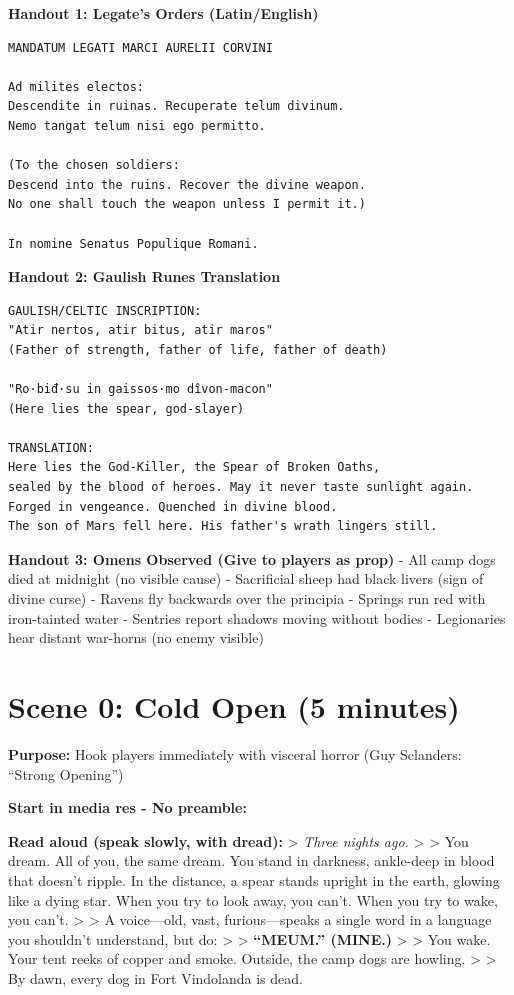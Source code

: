 \documentclass[
]{book}
\begin{document}
\textbf{Handout 1: Legate's Orders (Latin/English)}

\begin{verbatim}
MANDATUM LEGATI MARCI AURELII CORVINI

Ad milites electos:
Descendite in ruinas. Recuperate telum divinum.
Nemo tangat telum nisi ego permitto.

(To the chosen soldiers:
Descend into the ruins. Recover the divine weapon.
No one shall touch the weapon unless I permit it.)

In nomine Senatus Populique Romani.
\end{verbatim}

\textbf{Handout 2: Gaulish Runes Translation}

\begin{verbatim}
GAULISH/CELTIC INSCRIPTION:
"Atir nertos, atir bitus, atir maros"
(Father of strength, father of life, father of death)

"Ro·biđ·su in gaissos·mo dîvon-macon"
(Here lies the spear, god-slayer)

TRANSLATION:
Here lies the God-Killer, the Spear of Broken Oaths,
sealed by the blood of heroes. May it never taste sunlight again.
Forged in vengeance. Quenched in divine blood.
The son of Mars fell here. His father's wrath lingers still.
\end{verbatim}

\textbf{Handout 3: Omens Observed (Give to players as prop)} - All camp
dogs died at midnight (no visible cause) - Sacrificial sheep had black
livers (sign of divine curse) - Ravens fly backwards over the principia
- Springs run red with iron-tainted water - Sentries report shadows
moving without bodies - Legionaries hear distant war-horns (no enemy
visible)

\section{Scene 0: Cold Open (5
minutes)}\label{scene-0-cold-open-5-minutes}

\textbf{Purpose:} Hook players immediately with visceral horror (Guy
Sclanders: ``Strong Opening'')

\textbf{Start in media res - No preamble:}

\textbf{Read aloud (speak slowly, with dread):} \textgreater{}
\emph{Three nights ago.} \textgreater{} \textgreater{} You dream. All of
you, the same dream. You stand in darkness, ankle-deep in blood that
doesn't ripple. In the distance, a spear stands upright in the earth,
glowing like a dying star. When you try to look away, you can't. When
you try to wake, you can't. \textgreater{} \textgreater{} A voice---old,
vast, furious---speaks a single word in a language you shouldn't
understand, but do: \textgreater{} \textgreater{} \textbf{``MEUM.''
(MINE.)} \textgreater{} \textgreater{} You wake. Your tent reeks of
copper and smoke. Outside, the camp dogs are howling. \textgreater{}
\textgreater{} By dawn, every dog in Fort Vindolanda is dead.
\end{document}
